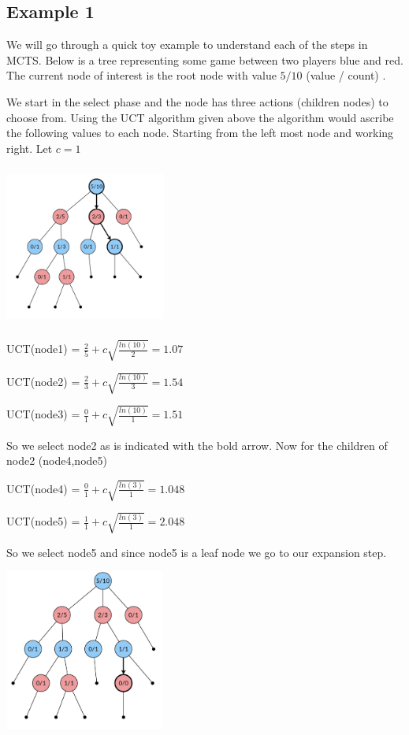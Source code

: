 \subsection{Example 1}

We will go through a quick toy example to understand each of the steps in MCTS. 
Below is a tree representing some game between two players blue and red. The current node of interest is the root node with value $ 5 / 10 $ (value / count) . 

We start in the select phase and the node has three actions (children nodes) to choose from. Using the UCT algorithm given above the algorithm would ascribe the following values to each node. Starting from the left most node and working right. Let $ c = 1 $

\includegraphics[width=200px,height=200px]{images/mcts_selection.png}

UCT(node1) = $ \frac{2}{5} + c \sqrt{\frac{ln({10})}{2}} = 1.07$

UCT(node2) = $ \frac{2}{3} + c \sqrt{\frac{ln({10})}{3}} = 1.54$

UCT(node3) = $ \frac{0}{1} + c \sqrt{\frac{ln({10})}{1}} = 1.51$

So we select node2 as is indicated with the bold arrow. Now for the children of node2 (node4,node5)

UCT(node4) = $ \frac{0}{1} + c \sqrt{\frac{ln({3})}{1}} = 1.048$

UCT(node5) = $ \frac{1}{1} + c \sqrt{\frac{ln({3})}{1}} = 2.048$

So we select node5 and since node5 is a leaf node we go to our expansion step.

\includegraphics[width=200px,height=200px]{images/mcts_expansion.png}


